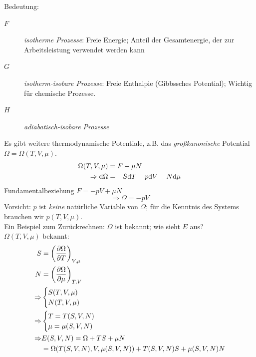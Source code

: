 Bedeutung:
\begin{description}
    \item[$F$] \emph{isotherme Prozesse}: Freie Energie; Anteil der Gesamtenergie, der zur Arbeitsleistung verwendet werden kann
    \item[$G$] \emph{isotherm-isobare Prozesse}: Freie Enthalpie (Gibbssches Potential); Wichtig für chemische Prozesse.
    \item[$H$] \emph{adiabatisch-isobare Prozesse}
\end{description}
Es gibt weitere thermodynamische Potentiale, z.B. das \emph{großkanonische} Potential $\Omega = \Omega(T, V, \mu)$. 
\begin{equation}
    \begin{split}
        \Omega(T, V, \mu) &= F - \mu N \\
        \Rightarrow \mathrm{d} \Omega &= - S \mathrm{d} T - p \mathrm{d} V - N \mathrm{d} \mu
    \end{split}
\end{equation}
Fundamentalbeziehung $F=-pV + \mu N$
\begin{equation}
    \Rightarrow \Omega = - p V
\end{equation}
Vorsicht: $p$ ist \emph{keine} natürliche Variable von $\Omega$; für die Kenntnis des Systems brauchen wir $p(T, V, \mu)$.\\[\baselineskip]
Ein Beispiel zum Zurückrechnen: $\Omega$ ist bekannt; wie sieht $E$ aus? \\
$\Omega(T, V, \mu)$ bekannt:
\begin{equation}
    \begin{split}
        S &= \left( \frac{\partial \Omega}{\partial T} \right)_{V, \mu} \\
        N &= \left( \frac{\partial \Omega}{\partial \mu} \right)_{T, V} \\
        \Rightarrow &
        \begin{cases}
            S(T, V, \mu) \\
            N(T, V, \mu)
        \end{cases} \\
        \Rightarrow &
        \begin{cases}
            T = T(S, V, N) \\
            \mu = \mu(S, V, N)
        \end{cases} \\
        \Rightarrow & E(S, V, N) = \Omega + TS + \mu N \\
        &= \Omega(T(S, V, N), V, \mu(S, V, N)) + T(S, V, N) S + \mu (S, V, N) N
    \end{split}
\end{equation}
